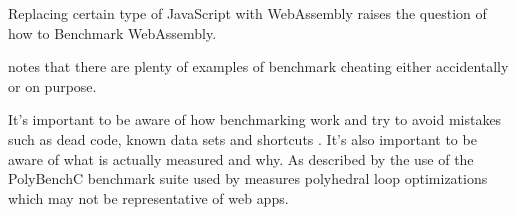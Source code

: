 Replacing certain type of JavaScript with WebAssembly raises the question of how to Benchmark WebAssembly. 

\textcite{CaiNerurkarWu1998} notes that there are plenty of examples of benchmark cheating either accidentally or on purpose. 

It's important to be aware of how benchmarking work and try to avoid mistakes such as dead code, known data sets and shortcuts \parencite{CaiNerurkarWu1998}. It's also important to be aware of what is actually measured and why. As described by \textcite{JangdaPowersGuhaBerger2019} the use of the PolyBenchC benchmark suite used by \textcite{HaasRossbergSchuffTitzerHolmanGohmanWagnerZakaiBastien2017} measures polyhedral loop optimizations which may not be representative of web apps.




